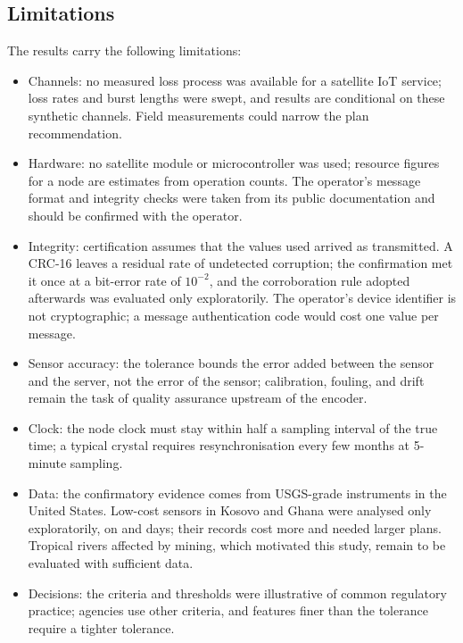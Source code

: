 \subsection{Limitations}
The results carry the following limitations:
\begin{itemize}
  \item Channels: no measured loss process was available for a satellite IoT service; loss rates and burst lengths were swept, and results are conditional on these synthetic channels. Field measurements could narrow the plan recommendation.
  \item Hardware: no satellite module or microcontroller was used; resource figures for a node are estimates from operation counts. The operator's message format and integrity checks were taken from its public documentation \citep{kineis2024formats} and should be confirmed with the operator.
  \item Integrity: certification assumes that the values used arrived as transmitted. A CRC-16 leaves a residual rate of undetected corruption; the confirmation met it once at a bit-error rate of $10^{-2}$, and the corroboration rule adopted afterwards was evaluated only exploratorily. The operator's device identifier is not cryptographic; a message authentication code would cost one value per message.
  \item Sensor accuracy: the tolerance bounds the error added between the sensor and the server, not the error of the sensor; calibration, fouling, and drift remain the task of quality assurance upstream of the encoder.
  \item Clock: the node clock must stay within half a sampling interval of the true time; a typical crystal requires resynchronisation every few months at 5-minute sampling.
  \item Data: the confirmatory evidence comes from USGS-grade instruments in the United States. Low-cost sensors in Kosovo and Ghana were analysed only exploratorily, on \inwsDays{} and \weijaDays{} days; their records cost more and needed larger plans. Tropical rivers affected by mining, which motivated this study, remain to be evaluated with sufficient data.
  \item Decisions: the criteria and thresholds were illustrative of common regulatory practice; agencies use other criteria, and features finer than the tolerance require a tighter tolerance.
\end{itemize}
